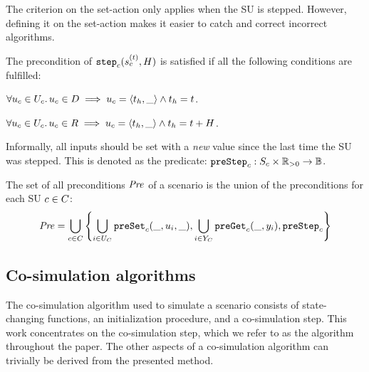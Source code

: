   The criterion on the set-action only applies when the SU is stepped. 
  However, defining it on the set-action makes it easier to catch and correct incorrect algorithms.
  
  \begin{definition}\label{def:step}
  The precondition of $\mathtt{step}_{c}(s_{c}^{(t)}, H)$ is satisfied if all the following conditions are fulfilled:
  \begin{compactitem}
    \item $\forall u_{c} \in U_{c} \ldotp u_{c} \in D \implies u_{c} =  \left\langle t_h,\_ \right\rangle  \land t_h = t$. 
    \item  $\forall u_{c} \in U_{c} \ldotp u_{c} \in R \implies u_{c} =  \left\langle t_h,\_ \right\rangle  \land t_h = t + H$.
  \end{compactitem}
  Informally, all inputs should be set with a \textit{new} value since the last time the SU was stepped.
  This is denoted as the predicate: $\mathtt{preStep}_{c}: S_{c} \times \mathbb{R}_{> 0} \to \mathbb{B}$.
\end{definition}

\begin{definition}\label{def:precondition}
  The set of all preconditions $\mathit{Pre}$ of a scenario is the union of the preconditions for each SU $c \in C$:
  \begin{align}
    \mathit{Pre} = \bigcup_{c \in C}  \left\{ \bigcup_{i \in U_{C}}\mathtt{preSet}_{c}(\_, u_{i}, \_), \bigcup_{i \in Y_{C}}\mathtt{preGet}_{c}(\_, y_{i}), \mathtt{preStep}_{c} \right\}
  \end{align}
\end{definition}


\subsection{Co-simulation algorithms}\label{sc:cosimalgo}
The co-simulation algorithm used to simulate a scenario consists of state-changing functions, an initialization procedure, and a co-simulation step.
This work concentrates on the co-simulation step, which we refer to as the algorithm throughout the paper. 
The other aspects of a co-simulation algorithm can trivially be derived from the presented method.  

